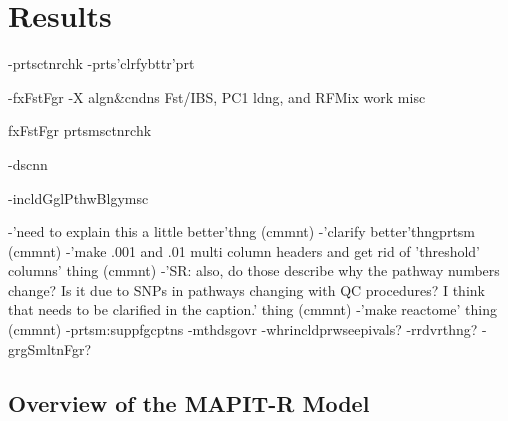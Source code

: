 \documentclass[12pt,a4paper]{article}
\begin{document}
\section{Results}\label{InterPath-Results}

-prtsctnrchk
-prts'clrfybttr'prt

-fxFstFgr
-X algn\&cndns Fst/IBS, PC1 ldng, and RFMix work misc

fxFstFgr
prtsmsctnrchk

-dscnn


-incldGglPthwBlgymsc




-'need to explain this a little better'thng (cmmnt)
-'clarify better'thngprtsm (cmmnt)
-'make .001 and .01 multi column headers and get rid of 'threshold' columns' thing (cmmnt)
-'SR: also, do those describe why the pathway numbers change? Is it due to SNPs in pathways changing with QC procedures? I think that needs to be clarified in the caption.' thing (cmmnt)
-'make reactome' thing (cmmnt)
-prtsm:suppfgcptns
-mthdsgovr
-whrincldprwseepivals?
-rrdvrthng?
-grgSmltnFgr?

\subsection{Overview of the MAPIT-R Model}\label{InterPath-Results-MAPITRModel}
\end{document}
